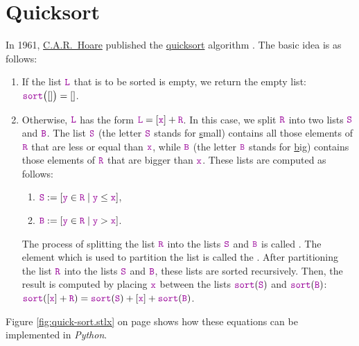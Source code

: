 \section{Quicksort}
In 1961, \href{http://en.wikipedia.org/wiki/Tony_Hoare}{C.A.R.~Hoare}  published the
\href{http://en.wikipedia.org/wiki/Quicksort}{quicksort} algorithm \cite{hoare:61}.  The basic idea is as follows:
\begin{enumerate}
\item If the list $\mytt{L}$ that is to be sorted is empty, we return  the empty list: 
      \\[0.2cm]
      \hspace*{1.3cm} $\mytt{sort}\bigl([]\bigr) = []$.
\item Otherwise, $\mytt{L}$ has the form $\mytt{L} = [\mytt{x}] + \mytt{R}$.  In this case, we split $\mytt{R}$ into two lists $\mytt{S}$ and $\mytt{B}$.
      The list $\mytt{S}$ (the letter $\mytt{S}$ stands for \underline{s}mall) contains all those elements of $\mytt{R}$ that are less
      or equal than $\mytt{x}$,     while $\mytt{B}$ (the letter $\mytt{B}$ stands for \underline{b}ig) contains
      those elements of $\mytt{R}$ that are bigger than $\mytt{x}$.  These lists are computed as follows:
      \begin{enumerate}
      \item $\mytt{S} := [\mytt{y} \in \mytt{R} \mid \mytt{y} \leq \mytt{x}]$,
      \item $\mytt{B} := [\mytt{y} \in \mytt{R} \mid \mytt{y} > \mytt{x}]$.
      \end{enumerate}
      The process of splitting the list $\mytt{R}$ into the lists $\mytt{S}$ and $\mytt{B}$
      is called .  The element  which is used to partition
      the list is called the .
      After partitioning the list $\mytt{R}$ into the lists $\mytt{S}$ and $\mytt{B}$, these lists are sorted 
      recursively.  Then, the result is computed by placing $\mytt{x}$ between the lists $\mytt{sort}(\mytt{S})$ and $\mytt{sort}(\mytt{B})$:
      \\[0.2cm]
      \hspace*{1.3cm}
      $\mytt{sort}([\mytt{x}]+\mytt{R}) = \mytt{sort}(\mytt{S}) + [\mytt{x}] + \mytt{sort}(\mytt{B})$.
\end{enumerate}
Figure \ref{fig:quick-sort.stlx} on page \pageref{fig:quick-sort.stlx} shows how these equations can
be implemented in \textsl{Python}.

